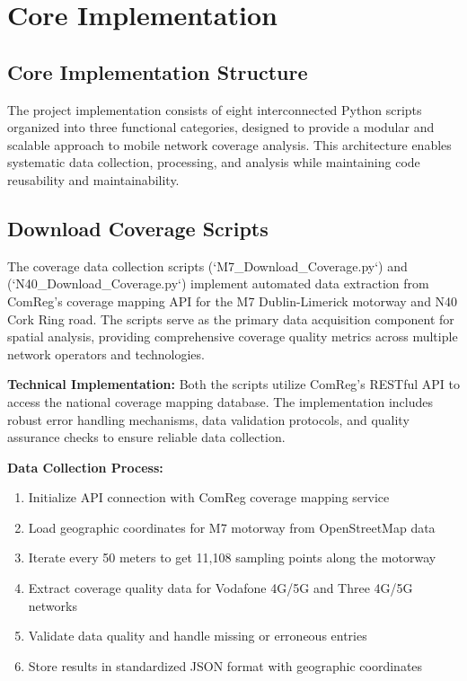 \documentclass[MScCS]{uccthesis}
\begin{document}
  \section{Core Implementation}

  \subsection{Core Implementation Structure}
The project implementation consists of eight interconnected Python scripts organized into three functional categories, designed to provide a modular and scalable approach to mobile network coverage analysis. This architecture enables systematic data collection, processing, and analysis while maintaining code reusability and maintainability.

\subsection{Download Coverage Scripts }

The coverage data collection scripts (`M7\_Download\_Coverage.py`) and (`N40\_Download\_Coverage.py`)  implement automated data extraction from ComReg's coverage mapping API for the M7 Dublin-Limerick motorway and N40 Cork Ring road. The scripts serve as the primary data acquisition component for spatial analysis, providing comprehensive coverage quality metrics across multiple network operators and technologies.



\textbf{Technical Implementation:}
Both the scripts utilize ComReg's RESTful API to access the national coverage mapping database. The implementation includes robust error handling mechanisms, data validation protocols, and quality assurance checks to ensure reliable data collection.

\textbf{Data Collection Process:}
\begin{enumerate}
\item Initialize API connection with ComReg coverage mapping service
\item Load geographic coordinates for M7 motorway from OpenStreetMap data
\item Iterate every 50 meters to get 11,108 sampling points along the motorway
\item Extract coverage quality data for Vodafone 4G/5G and Three 4G/5G networks
\item Validate data quality and handle missing or erroneous entries
\item Store results in standardized JSON format with geographic coordinates
\end{enumerate}
\end{document}
